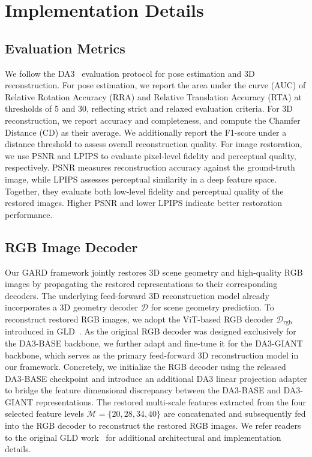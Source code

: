 \documentclass{llmxive}
\begin{document}
\section{Implementation Details}

\subsection{Evaluation Metrics}
We follow the DA3~\cite{depthanything3} evaluation protocol for pose estimation and 3D reconstruction. For pose estimation, we report the area under the curve (AUC) of Relative Rotation Accuracy (RRA) and Relative Translation Accuracy (RTA) at thresholds of 5 and 30, reflecting strict and relaxed evaluation criteria. For 3D reconstruction, we report accuracy and completeness, and compute the Chamfer Distance (CD) as their average. We additionally report the F1-score under a distance threshold to assess overall reconstruction quality. For image restoration, we use PSNR and LPIPS to evaluate pixel-level fidelity and perceptual quality, respectively. PSNR measures reconstruction accuracy against the ground-truth image, while LPIPS assesses perceptual similarity in a deep feature space. Together, they evaluate both low-level fidelity and perceptual quality of the restored images. Higher PSNR and lower LPIPS indicate better restoration performance.



\subsection{RGB Image Decoder}
Our GARD framework jointly restores 3D scene geometry and high-quality RGB images by propagating the restored representations to their corresponding decoders. The underlying feed-forward 3D reconstruction model already incorporates a 3D geometry decoder $\mathcal{D}$ for scene geometry prediction. To reconstruct restored RGB images, we adopt the ViT-based RGB decoder $\mathcal{D}_{\text{rgb}}$ introduced in GLD~\cite{jang2026gld}. As the original RGB decoder was designed exclusively for the DA3-BASE backbone, we further adapt and fine-tune it for the DA3-GIANT backbone, which serves as the primary feed-forward 3D reconstruction model in our framework. Concretely, we initialize the RGB decoder using the released DA3-BASE checkpoint and introduce an additional DA3 linear projection adapter to bridge the feature dimensional discrepancy between the DA3-BASE and DA3-GIANT representations. The restored multi-scale features extracted from the four selected feature levels $\mathcal{M}=\{20, 28, 34, 40\}$ are concatenated and subsequently fed into the RGB decoder to reconstruct the restored RGB images. We refer readers to the original GLD work~\cite{jang2026gld} for additional architectural and implementation details.
\end{document}
